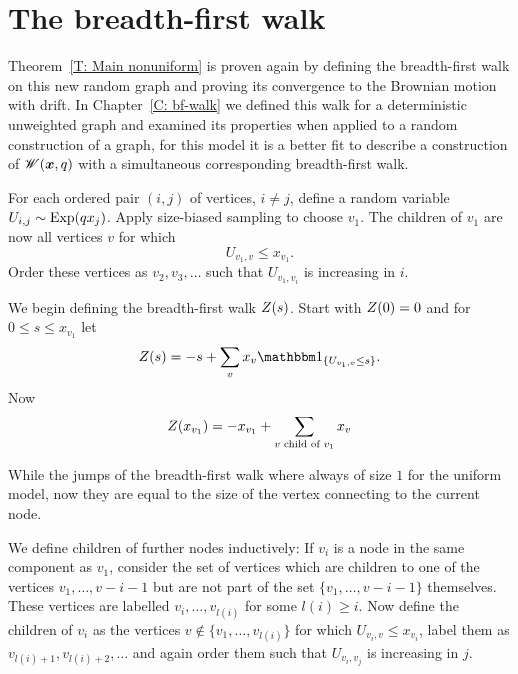 \section{The breadth-first walk}

Theorem~\ref{T: Main nonuniform} is proven again by defining the breadth-first walk on this new random graph
and proving its convergence to the Brownian motion with drift.
In Chapter~\ref{C: bf-walk} we defined this walk for a deterministic unweighted graph 
and examined its properties when applied to a random construction of a graph,
for this model it is a better fit to describe a construction of $\mathscr{W}(\boldsymbol{x}, q)$ with a simultaneous corresponding breadth-first walk.

For each ordered pair $(i, j)$ of vertices, $i \neq j$, define a random variable $U_{i,j} \sim \operatorname*{Exp}(q x_j)$.
Apply size-biased sampling to choose $v_1$.
The children of $v_1$ are now all vertices $v$ for which
\begin{equation}
	U_{v_1, v} \leq x_{v_1}.
\end{equation}
Order these vertices as $v_2, v_3, \dots$ such that $U_{v_1, v_i}$ is increasing in $i$.

We begin defining the breadth-first walk $Z(s)$.
Start with $Z(0) = 0$ and for $0 \leq s \leq x_{v_1}$ let
\begin{equation}
	\bfw(s) = -s + \sum_{v} x_v \Ind{\{U_{v_1, v} \leq s\}}.
\end{equation}
Now
\begin{equation}
	Z(x_{v_1}) = -x_{v_1} + \sum_{\text{$v$ child of $v_1$}} x_v
\end{equation}


While the jumps of the breadth-first walk where always of size $1$ for the uniform model,
now they are equal to the size of the vertex connecting to the current node.

We define children of further nodes inductively:
If $v_i$ is a node in the same component as $v_1$,
consider the set of vertices which are children to one of the vertices $v_1, \dots, v-{i-1}$
but are not part of the set $\{v_1, \dots, v-{i-1}\}$ themselves.
These vertices are labelled $v_i, \dots, v_{l(i)}$ for some $l(i) \geq i$.
Now define the children of $v_i$ as the vertices 
$v \notin \{v_1, \dots, v_{l(i)}\}$ for which $U_{v_i, v} \leq x_{v_i}$,
label them as $v_{l(i) + 1}, v_{l(i) + 2}, \dots$ 
and again order them such that $U_{v_i, v_j}$ is increasing in $j$.
 

